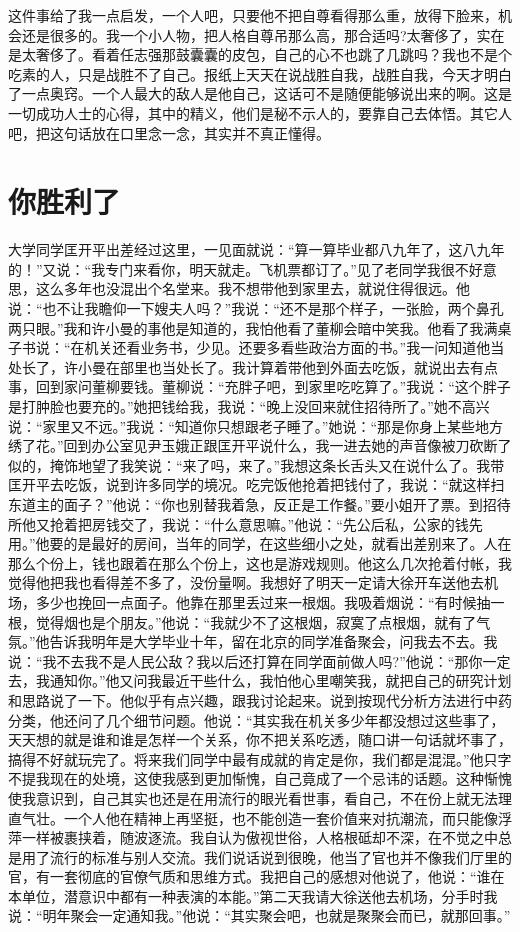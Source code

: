 \documentclass[12pt,oneside]{book}
\begin{document}
这件事给了我一点启发，一个人吧，只要他不把自尊看得那么重，放得下脸来，机会还是很多的。我一个小人物，把人格自尊吊那么高，那合适吗?太奢侈了，实在是太奢侈了。看着任志强那鼓囊囊的皮包，自己的心不也跳了几跳吗？我也不是个吃素的人，只是战胜不了自己。报纸上天天在说战胜自我，战胜自我，今天才明白了一点奥窍。一个人最大的敌人是他自己，这话可不是随便能够说出来的啊。这是一切成功人士的心得，其中的精义，他们是秘不示人的，要靠自己去体悟。其它人吧，把这句话放在口里念一念，其实并不真正懂得。


\chapter{你胜利了}

大学同学匡开平出差经过这里，一见面就说：``算一算毕业都八九年了，这八九年的！''又说：``我专门来看你，明天就走。飞机票都订了。''见了老同学我很不好意思，这么多年也没混出个名堂来。我不想带他到家里去，就说住得很远。他说：``也不让我瞻仰一下嫂夫人吗？''我说：``还不是那个样子，一张脸，两个鼻孔两只眼。''我和许小曼的事他是知道的，我怕他看了董柳会暗中笑我。他看了我满桌子书说：``在机关还看业务书，少见。还要多看些政治方面的书。''我一问知道他当处长了，许小曼在部里也当处长了。我计算着带他到外面去吃饭，就说出去有点事，回到家问董柳要钱。董柳说：``充胖子吧，到家里吃吃算了。''我说：``这个胖子是打肿脸也要充的。''她把钱给我，我说：``晚上没回来就住招待所了。''她不高兴说：``家里又不远。''我说：``知道你只想跟老子睡了。''她说：``那是你身上某些地方绣了花。''回到办公室见尹玉娥正跟匡开平说什么，我一进去她的声音像被刀砍断了似的，掩饰地望了我笑说：``来了吗，来了。''我想这条长舌头又在说什么了。我带匡开平去吃饭，说到许多同学的境况。吃完饭他抢着把钱付了，我说：``就这样扫东道主的面子？''他说：``你也别替我着急，反正是工作餐。''要小姐开了票。到招待所他又抢着把房钱交了，我说：``什么意思嘛。''他说：``先公后私，公家的钱先用。''他要的是最好的房间，当年的同学，在这些细小之处，就看出差别来了。人在那么个份上，钱也跟着在那么个份上，这也是游戏规则。他这么几次抢着付帐，我觉得他把我也看得差不多了，没份量啊。我想好了明天一定请大徐开车送他去机场，多少也挽回一点面子。他靠在那里丢过来一根烟。我吸着烟说：``有时候抽一根，觉得烟也是个朋友。''他说：``我就少不了这根烟，寂寞了点根烟，就有了气氛。''他告诉我明年是大学毕业十年，留在北京的同学准备聚会，问我去不去。我说：``我不去我不是人民公敌？我以后还打算在同学面前做人吗?''他说：``那你一定去，我通知你。''他又问我最近干些什么，我怕他心里嘲笑我，就把自己的研究计划和思路说了一下。他似乎有点兴趣，跟我讨论起来。说到按现代分析方法进行中药分类，他还问了几个细节问题。他说：``其实我在机关多少年都没想过这些事了，天天想的就是谁和谁是怎样一个关系，你不把关系吃透，随口讲一句话就坏事了，搞得不好就玩完了。将来我们同学中最有成就的肯定是你，我们都是混混。''他只字不提我现在的处境，这使我感到更加惭愧，自己竟成了一个忌讳的话题。这种惭愧使我意识到，自己其实也还是在用流行的眼光看世事，看自己，不在份上就无法理直气壮。一个人他在精神上再坚挺，也不能创造一套价值来对抗潮流，而只能像浮萍一样被裹挟着，随波逐流。我自认为傲视世俗，人格根砥却不深，在不觉之中总是用了流行的标准与别人交流。我们说话说到很晚，他当了官也并不像我们厅里的官，有一套彻底的官僚气质和思维方式。我把自己的感想对他说了，他说：``谁在本单位，潜意识中都有一种表演的本能。''第二天我请大徐送他去机场，分手时我说：``明年聚会一定通知我。''他说：``其实聚会吧，也就是聚聚会而已，就那回事。''
\end{document}
